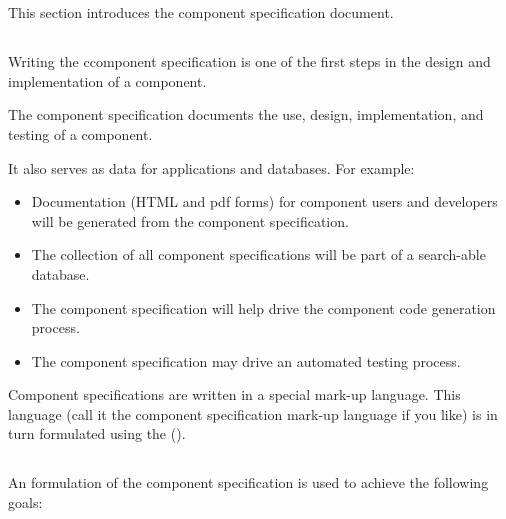 \documentclass[11pt]{article}
\begin{document}
\section{\SECintro}
\label{\SECintro}

This section introduces the component specification document.

\subsection{\SUBSECwhySpec}
\label{\SUBSECwhySpec}

Writing the \xml{} ccomponent specification is one of the first steps in the
design and implementation of a component.

The \xml{} component specification documents the use, design,
implementation, and testing of a \sr{} component.  

It also serves as data for applications and databases.  For example:

\begin{itemize}
\item Documentation (HTML and pdf forms) for component users and
  developers will be generated from the component specification.
  
\item The collection of all component specifications will be part of a 
  search-able database.
  
\item The component specification will help drive the component code
  generation process.
  
\item The component specification may drive an automated testing process.
\end{itemize}

Component specifications are written in a special mark-up language.  This
language (call it the component specification mark-up language if you
like) is in turn formulated using the 
(\xml).


\subsection{\SUBSECwhyXml}
\label{\SUBSECwhyXml}

An \xml{} formulation of the component specification is used to achieve
the following goals:
\end{document}
